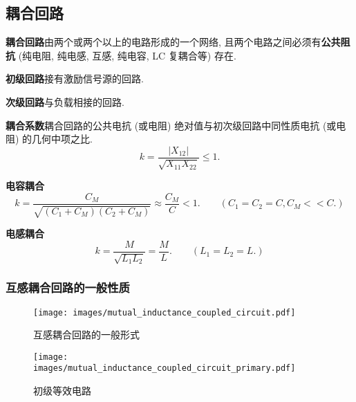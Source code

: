 \subsection{耦合回路} \label{耦合回路}

\textbf{耦合回路}\quad 由两个或两个以上的电路形成的一个网络, 且两个电路之间必须有\textbf{公共阻抗} (纯电阻, 纯电感, 互感, 纯电容, LC 复耦合等) 存在.

\textbf{初级回路}\quad 接有激励信号源的回路.

\textbf{次级回路}\quad 与负载相接的回路.

\textbf{耦合系数}\quad 耦合回路的公共电抗 (或电阻) 绝对值与初次级回路中同性质电抗 (或电阻) 的几何中项之比.
\begin{equation}
    k=\frac{|X_{12}|}{\sqrt{X_{11}X_{22}}}\leq 1.
\end{equation}

\textbf{电容耦合}
\begin{equation}
    k=\frac{C_M}{\sqrt{(C_1+C_M)(C_2+C_M)}}\approx\frac{C_M}{C}<1.\qquad (C_1=C_2=C,C_M<<C.)
\end{equation}

\textbf{电感耦合}
\begin{equation}
    k=\frac{M}{\sqrt{L_1L_2}}=\frac{M}{L}.\qquad (L_1=L_2=L.)
\end{equation}

\subsubsection{互感耦合回路的一般性质}

\begin{figure}[H]
    \begin{center}
        \begin{minipage}{.625\textwidth}
            \centering
            \texttt{[image: images/mutual\_inductance\_coupled\_circuit.pdf]}
            \caption{互感耦合回路的一般形式}
        \end{minipage}
        \begin{minipage}{.365\textwidth}
            \centering
            \texttt{[image: images/mutual\_inductance\_coupled\_circuit\_primary.pdf]}
            \caption{初级等效电路}
        \end{minipage}
    \end{center}
\end{figure}

